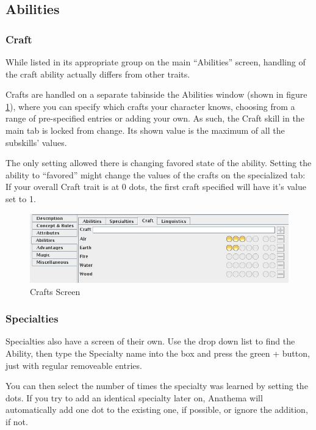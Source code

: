 \subsection{Abilities}
\subsubsection{Craft}
While listed in its appropriate group on the main "`Abilities"' screen, handling of the craft ability actually differs from other traits.

Crafts are handled on a separate tabinside the Abilities window (shown in figure \ref{fig:crafts}), where you can specify which crafts your character knows, choosing from a range of pre-specified entries or adding your own. As such, the Craft skill in the main tab is locked from change. Its shown value is the maximum of all the subskills' values.

The only setting allowed there is changing favored state of the ability. Setting the ability to "`favored"' might change the values of the crafts on the specialized tab: If your overall Craft trait is at 0 dots, the first craft specified will have it's value set to 1.


\begin{figure}
	\centering
		\includegraphics[width=1.00\textwidth]{images/crafts.jpg}
	\caption{Crafts Screen}
	\label{fig:crafts}
\end{figure}

\subsubsection{Specialties}
Specialties also have a screen of their own. Use the drop down list to find the Ability, then type the Specialty name into the box and press the green + button, just with regular removeable entries.

You can then select the number of times the specialty was learned by setting the dots. If you try to add an identical specialty later on, Anathema will automatically add one dot to the existing one, if possible, or ignore the addition, if not.

